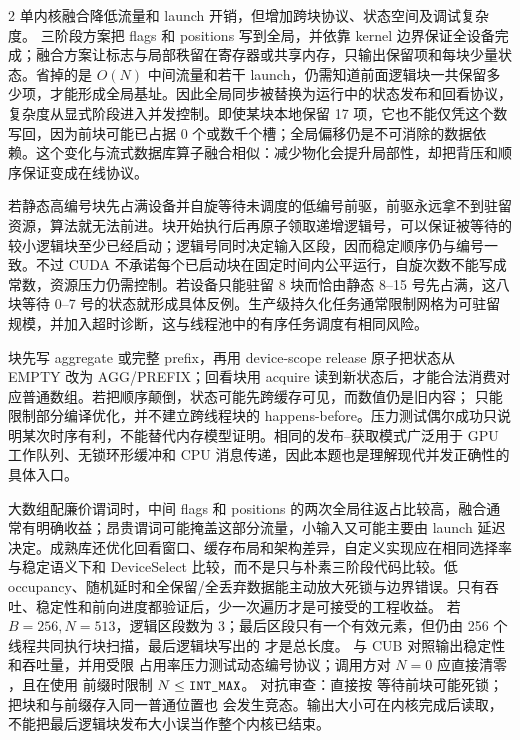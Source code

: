 \begin{solutionexercise}{2}
\conclusionheading 单内核融合降低流量和 launch 开销，但增加跨块协议、状态空间及调试复杂度。
\discussionheading
{}三阶段方案把 flags 和 positions 写到全局，并依靠 kernel 边界保证全设备完成；融合方案让标志与局部秩留在寄存器或共享内存，只输出保留项和每块少量状态。省掉的是 $O(N)$ 中间流量和若干 launch，仍需知道前面逻辑块一共保留多少项，才能形成全局基址。因此全局同步被替换为运行中的状态发布和回看协议，复杂度从显式阶段进入并发控制。即使某块本地保留 17 项，它也不能仅凭这个数写回，因为前块可能已占据 0 个或数千个槽；全局偏移仍是不可消除的数据依赖。这个变化与流式数据库算子融合相似：减少物化会提升局部性，却把背压和顺序保证变成在线协议。

若静态高编号块先占满设备并自旋等待未调度的低编号前驱，前驱永远拿不到驻留资源，算法就无法前进。块开始执行后再原子领取递增逻辑号，可以保证被等待的较小逻辑块至少已经启动；逻辑号同时决定输入区段，因而稳定顺序仍与编号一致。不过 CUDA 不承诺每个已启动块在固定时间内公平运行，自旋次数不能写成常数，资源压力仍需控制。若设备只能驻留 8 块而恰由静态 8--15 号先占满，这八块等待 0--7 号的状态就形成具体反例。生产级持久化任务通常限制网格为可驻留规模，并加入超时诊断，这与线程池中的有序任务调度有相同风险。

块先写 aggregate 或完整 prefix，再用 device-scope release 原子把状态从 EMPTY 改为 AGG/PREFIX；回看块用 acquire 读到新状态后，才能合法消费对应普通数组。若把顺序颠倒，状态可能先跨缓存可见，而数值仍是旧内容； 只能限制部分编译优化，并不建立跨线程块的 happens-before。压力测试偶尔成功只说明某次时序有利，不能替代内存模型证明。相同的发布--获取模式广泛用于 GPU 工作队列、无锁环形缓冲和 CPU 消息传递，因此本题也是理解现代并发正确性的具体入口。

大数组配廉价谓词时，中间 flags 和 positions 的两次全局往返占比较高，融合通常有明确收益；昂贵谓词可能掩盖这部分流量，小输入又可能主要由 launch 延迟决定。成熟库还优化回看窗口、缓存布局和架构差异，自定义实现应在相同选择率与稳定语义下和 DeviceSelect 比较，而不是只与朴素三阶段代码比较。低 occupancy、随机延时和全保留/全丢弃数据能主动放大死锁与边界错误。只有吞吐、稳定性和前向进度都验证后，少一次遍历才是可接受的工程收益。
\variantheading 若 $B=256,N=513$，逻辑区段数为 3；最后区段只有一个有效元素，但仍由
256 个线程共同执行块扫描，最后逻辑块写出的  才是总长度。
\practiceheading 与 CUB  对照输出稳定性和吞吐量，并用受限
占用率压力测试动态编号协议；调用方对 $N=0$ 应直接清零 ，且在使用
 前缀时限制 $N\le\code{INT_MAX}$。
对抗审查：直接按  等待前块可能死锁；把块和与前缀存入同一普通位置也
会发生竞态。输出大小可在内核完成后读取，不能把最后逻辑块发布大小误当作整个内核已结束。
\end{solutionexercise}


